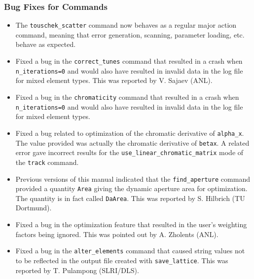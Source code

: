 \documentclass[11pt]{article}
\begin{document}
\subsubsection{Bug Fixes for Commands}
\begin{itemize}
\item The \verb|touschek_scatter| command now behaves as a regular major action command, meaning that error generation, scanning,
  parameter loading, etc.  behave as expected.
\item Fixed a bug in the \verb|correct_tunes| command that resulted in a crash when \verb|n_iterations=0| and would also have
  resulted in invalid data in the log file for mixed element types. This was reported by V. Sajaev (ANL).
\item Fixed a bug in the \verb|chromaticity| command that resulted in a crash when \verb|n_iterations=0| and would also have
  resulted in invalid data in the log file for mixed element types.
\item Fixed a bug related to optimization of the chromatic derivative of \verb|alpha_x|. The value provided was actually the
  chromatic derivative of \verb|betax|. A related error gave incorrect results for the \verb|use_linear_chromatic_matrix| mode of 
  the \verb|track| command.
\item Previous versions of this manual indicated that the \verb|find_aperture| command provided a quantity \verb|Area| giving
  the dynamic aperture area for optimization. The quantity is in fact called \verb|DaArea|. This was reported by S. Hilbrich (TU Dortmund).
\item Fixed a bug in the optimization feature that resulted in the user's weighting factors being ignored. This was pointed out
  by A. Zholents (ANL).
\item Fixed a bug in the \verb|alter_elements| command that caused string values not to be reflected in the output file created
  with \verb|save_lattice|. This was reported by T. Pulampong (SLRI/DLS).
\end{itemize}
\end{document}
